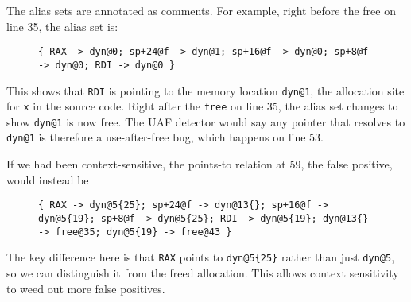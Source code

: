 The alias sets are annotated as comments. For example, right before
the free on line 35, the alias set is:

\begin{figure}[h!]
\texttt{\{ RAX -> dyn@0; sp+24@f -> dyn@1;
    sp+16@f -> dyn@0; sp+8@f -> dyn@0;
    RDI -> dyn@0 \}}
\end{figure}

This shows that \texttt{RDI} is pointing to the memory location \texttt{dyn@1}, the allocation site for \texttt{x} in the source code.
Right after the \texttt{free} on line 35, the alias set changes to show \texttt{dyn@1} is now free.
The UAF detector would say any pointer that resolves to \texttt{dyn@1} is therefore a use-after-free bug, which happens on
line 53.

If we had been context-sensitive, the points-to relation at 59, the false positive, would instead be
\begin{figure}[h!]
\texttt{\{ RAX -> dyn@5\{25\}; sp+24@f -> dyn@13\{\};
    sp+16@f -> dyn@5\{19\}; sp+8@f -> dyn@5\{25\};
    RDI -> dyn@5\{19\}; dyn@13\{\} -> free@35;
    dyn@5\{19\} -> free@43 \}}
\end{figure}

The key difference here is that \texttt{RAX} points to \texttt{dyn@5\{25\}} rather than just \texttt{dyn@5}, so we can distinguish it from the freed allocation.
This allows context sensitivity to weed out more false positives.
